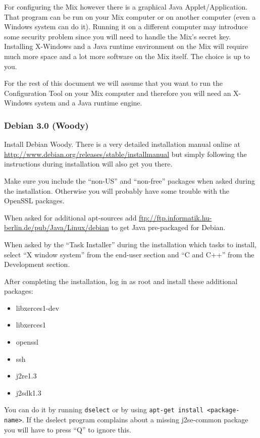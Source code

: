 \documentclass{article}
\begin{document}
For configuring the Mix however there is a graphical Java
Applet/Application. That program can be run on your Mix computer or on
another computer (even a Windows system can do it). Running it on a
different computer may introduce some security problem since you will
need to handle the Mix's secret key. Installing X-Windows and a Java
runtime environment on the Mix will require much more space and a lot
more software on the Mix itself. The choice is up to you.

For the rest of this document we will assume that you want to run the
Configuration Tool on your Mix computer and therefore you will need an
X-Windows system and a Java runtime engine. 


\subsubsection{Debian 3.0 (Woody)}

Install Debian Woody. There is a very detailed installation manual
online at \url{http://www.debian.org/releases/stable/installmanual}
but simply following the instructions during installation will also
get you there.

Make sure you include the ``non-US'' and ``non-free'' packages when
asked during the installation. Otherwise you will probably have some
trouble with the OpenSSL packages.

When asked for additional apt-sources add
\url{ftp://ftp.informatik.hu-berlin.de/pub/Java/Linux/debian} to get
Java pre-packaged for Debian.

When asked by the ``Task Installer'' during the installation which
tasks to install, select ``X window system'' from the end-user section
and ``C and C++'' from the Development section.

After completing the installation, log in as root and install these
additional packages: 

\begin{itemize}
\item libxerces1-dev
\item libxerces1
\item openssl
\item ssh 
\item j2re1.3
\item j2sdk1.3
\end{itemize}

You can do it by running \verb|dselect| or by using 
\verb|apt-get install <package-name>|. If the dselect program complains about a
missing j2se-common package you will have to press ``Q'' to ignore
this.
\end{document}
